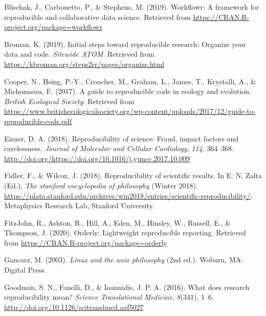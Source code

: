 \documentclass[12pt,twoside]{reedthesis}
\begin{document}

\noindent

\setlength{\parindent}{-0.20in} \setlength{\leftskip}{0.20in}
\setlength{\parskip}{8pt}

\hypertarget{refs}{}
\hypertarget{ref-R-workflowr}{}
Blischak, J., Carbonetto, P., \& Stephens, M. (2019). Workflowr: A
framework for reproducible and collaborative data science. Retrieved
from \url{https://CRAN.R-project.org/package=workflowr}

\hypertarget{ref-broman}{}
Broman, K. (2019). Initial steps toward reproducible research: Organize
your data and code. \emph{Sitewide ATOM}. Retrieved from
\url{https://kbroman.org/steps2rr/pages/organize.html}

\hypertarget{ref-cooper2017guide}{}
Cooper, N., Hsing, P.-Y., Croucher, M., Graham, L., James, T.,
Krystalli, A., \& Michonneau, F. (2017). A guide to reproducible code in
ecology and evolution. \emph{British Ecological Society}. Retrieved from
\url{https://www.britishecologicalsociety.org/wp-content/uploads/2017/12/guide-to-reproducible-code.pdf}

\hypertarget{ref-eisner-reproducibility}{}
Eisner, D. A. (2018). Reproducibility of science: Fraud, impact factors
and carelessness. \emph{Journal of Molecular and Cellular Cardiology},
\emph{114}, 364--368.
\url{http://doi.org/https://doi.org/10.1016/j.yjmcc.2017.10.009}

\hypertarget{ref-sep-scientific-reproducibility}{}
Fidler, F., \& Wilcox, J. (2018). Reproducibility of scientific results.
In E. N. Zalta (Ed.), \emph{The stanford encyclopedia of philosophy}
(Winter 2018).
\url{https://plato.stanford.edu/archives/win2018/entries/scientific-reproducibility/};
Metaphysics Research Lab, Stanford University.

\hypertarget{ref-R-orderly}{}
FitzJohn, R., Ashton, R., Hill, A., Eden, M., Hinsley, W., Russell, E.,
\& Thompson, J. (2020). Orderly: Lightweight reproducible reporting.
Retrieved from \url{https://CRAN.R-project.org/package=orderly}

\hypertarget{ref-unix}{}
Gancarz, M. (2003). \emph{Linux and the unix philosophy} (2nd ed.).
Woburn, MA: Digital Press.

\hypertarget{ref-Goodman341ps12}{}
Goodman, S. N., Fanelli, D., \& Ioannidis, J. P. A. (2016). What does
research reproducibility mean? \emph{Science Translational Medicine},
\emph{8}(341), 1--6. \url{http://doi.org/10.1126/scitranslmed.aaf5027}
\end{document}
